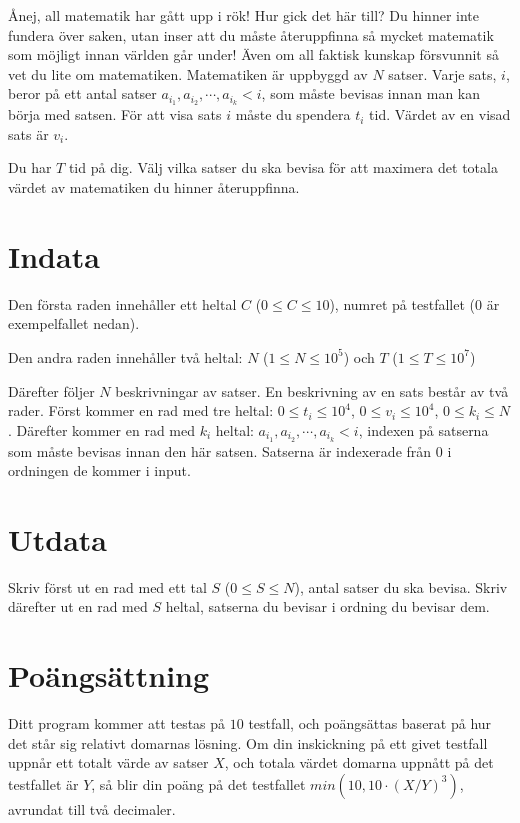 
Ånej, all matematik har gått upp i rök! Hur gick det här till? Du hinner inte fundera över saken, 
utan inser att du måste återuppfinna så mycket matematik som möjligt innan världen går under!
Även om all faktisk kunskap försvunnit så vet du lite om matematiken. 
Matematiken är uppbyggd av $N$ satser. Varje sats, $i$, beror på ett antal satser $a_{i_1}, a_{i_2}, \cdots, a_{i_k} < i$, 
som måste bevisas innan man kan börja med satsen. För att visa sats $i$ måste du spendera $t_i$ tid. 
Värdet av en visad sats är $v_i$.

Du har $T$ tid på dig. Välj vilka satser du ska bevisa för att maximera det totala värdet av matematiken du hinner återuppfinna.
\section*{Indata}
Den första raden innehåller ett heltal $C$ ($0 \leq C \leq 10$), numret på testfallet ($0$ är exempelfallet nedan).

Den andra raden innehåller två heltal: $N$ ($1 \le N \le 10^5$) och $T$ ($1 \le T \le 10^7$)

Därefter följer $N$ beskrivningar av satser.
En beskrivning av en sats består av två rader. Först kommer en rad med tre heltal: $0 \le t_i \le 10^4$, $0 \le v_i \le 10^4$, $0 \le k_i \le N$. 
Därefter kommer en rad med $k_i$ heltal: $a_{i_1}, a_{i_2}, \cdots, a_{i_k} < i$, indexen på satserna som måste bevisas innan den här satsen.
Satserna är indexerade från 0 i ordningen de kommer i input.

\section*{Utdata}
Skriv först ut en rad med ett tal $S$ ($0 \le S \le N$), antal satser du ska bevisa. Skriv därefter ut en rad med $S$ heltal, satserna du bevisar i ordning du bevisar dem.

\section*{Poängsättning}
Ditt program kommer att testas på $10$ testfall, och poängsättas baserat på hur det står sig relativt domarnas lösning.
Om din inskickning på ett givet testfall uppnår ett totalt värde av satser $X$, och totala värdet domarna uppnått på det testfallet är $Y$,
så blir din poäng på det testfallet $min(10, 10 \cdot (X / Y)^3)$, avrundat till två decimaler.

